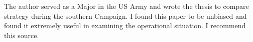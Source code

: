 The author served as a Major in the US Army and wrote the thesis to compare
strategy during the southern Campaign.   I found this paper to be unbiased and
found it extremely useful in examining the operational situation.  I recommend
this source. 
